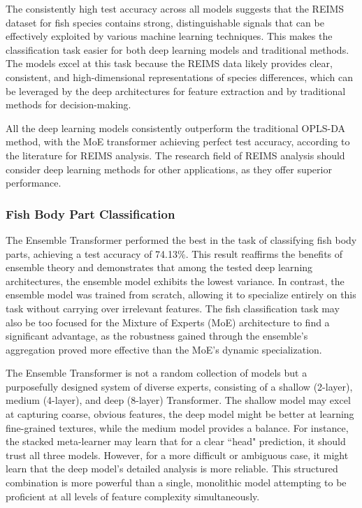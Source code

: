 The consistently high test accuracy across all models suggests that the REIMS dataset for fish species contains strong, distinguishable signals that can be effectively exploited by various machine learning techniques. This makes the classification task easier for both deep learning models and traditional methods. The models excel at this task because the REIMS data likely provides clear, consistent, and high-dimensional representations of species differences, which can be leveraged by the deep architectures for feature extraction and by traditional methods for decision-making.

All the deep learning models consistently outperform the traditional OPLS-DA method, with the MoE transformer achieving perfect test accuracy, according to the literature for REIMS analysis. The research field of REIMS analysis should consider deep learning methods for other applications, as they offer superior performance.

\subsubsection{Fish Body Part Classification}


The Ensemble Transformer performed the best in the task of classifying fish body parts, achieving a test accuracy of 74.13\%. This result reaffirms the benefits of ensemble theory and demonstrates that among the tested deep learning architectures, the ensemble model exhibits the lowest variance. 
In contrast, the ensemble model was trained from scratch, allowing it to specialize entirely on this task without carrying over irrelevant features. The fish classification task may also be too focused for the Mixture of Experts (MoE) architecture to find a significant advantage, as the robustness gained through the ensemble's aggregation proved more effective than the MoE's dynamic specialization.

The Ensemble Transformer is not a random collection of models but a purposefully designed system of diverse experts, consisting of a shallow (2-layer), medium (4-layer), and deep (8-layer) Transformer. The shallow model may excel at capturing coarse, obvious features, the deep model might be better at learning fine-grained textures, while the medium model provides a balance. For instance, the stacked meta-learner may learn that for a clear ``head" prediction, it should trust all three models. However, for a more difficult or ambiguous case, it might learn that the deep model's detailed analysis is more reliable. This structured combination is more powerful than a single, monolithic model attempting to be proficient at all levels of feature complexity simultaneously.

